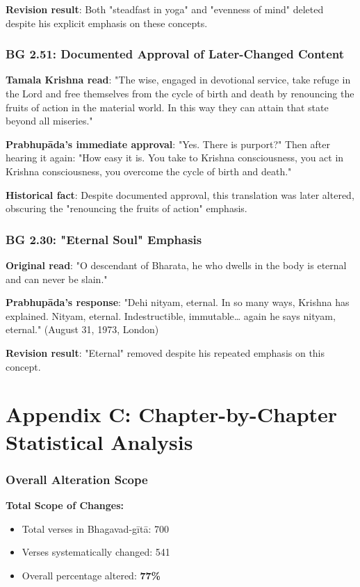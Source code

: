 \documentclass[11pt,twoside]{book}
\begin{document}
\textbf{\textbf{Revision result}}: Both "steadfast in yoga" and "evenness of mind" deleted despite his explicit emphasis on these concepts.
\section*{BG 2.51: Documented Approval of Later-Changed Content}
\label{sec:org8d40e53}
\textbf{\textbf{Tamala Krishna read}}: "The wise, engaged in devotional service, take refuge in the Lord and free themselves from the cycle of birth and death by renouncing the fruits of action in the material world. In this way they can attain that state beyond all miseries."

\textbf{\textbf{Prabhupāda's immediate approval}}: "Yes. There is purport?" Then after hearing it again: "How easy it is. You take to Krishna consciousness, you act in Krishna consciousness, you overcome the cycle of birth and death."

\textbf{\textbf{Historical fact}}: Despite documented approval, this translation was later altered, obscuring the "renouncing the fruits of action" emphasis.
\section*{BG 2.30: "Eternal Soul" Emphasis}
\label{sec:org37eab15}
\textbf{\textbf{Original read}}: "O descendant of Bharata, he who dwells in the body is eternal and can never be slain."

\textbf{\textbf{Prabhupāda's response}}: "Dehi nityam, eternal. In so many ways, Krishna has explained. Nityam, eternal. Indestructible, immutable\ldots{} again he says nityam, eternal." (August 31, 1973, London)

\textbf{\textbf{Revision result}}: "Eternal" removed despite his repeated emphasis on this concept.
\part*{Appendix C: Chapter-by-Chapter Statistical Analysis}
\label{sec:orgb184988}
\thispagestyle{plain}
\section*{Overall Alteration Scope}
\label{sec:org7615788}

\textbf{\textbf{Total Scope of Changes:}}
\begin{itemize}
\item Total verses in Bhagavad-gītā: 700
\item Verses systematically changed: 541
\item Overall percentage altered: \textbf{\textbf{77\%}}
\end{itemize}
\end{document}
